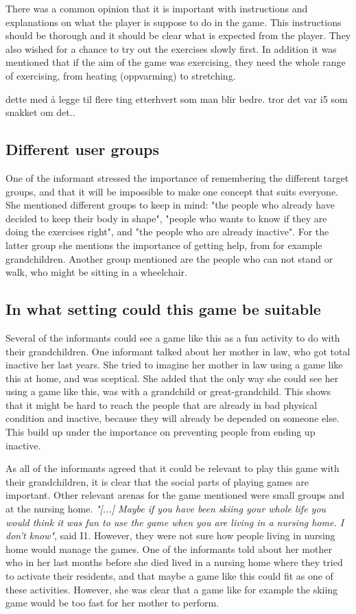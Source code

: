 There was a common opinion that it is important with instructions and explanations on what the player is suppose to do in the game. This instructions should be thorough and it should be clear what is expected from the player. They also wished for a chance to try out the exercises slowly first. In addition it was mentioned that if the aim of the game was exercising, they need the whole range of exercising, from heating (oppvarming) to stretching. 

dette med å legge til flere ting etterhvert som man blir bedre. tror det var i5 som snakket om det..

\subsection{Different user groups}
One of the informant stressed the importance of remembering the different target groups, and that it will be impossible to make one concept that suits everyone. She mentioned different groups to keep in mind: "the people who already have decided to keep their body in shape", "people who wants to know if they are doing the exercises right", and "the people who are already inactive". For the latter group she mentions the importance of getting help, from for example grandchildren.  Another group mentioned are the people who can not stand or walk, who might be sitting in a wheelchair.

\subsection{In what setting could this game be suitable}
Several of the informants could see a game like this as a fun activity to do with their grandchildren. One informant talked about her mother in law, who got total inactive her last years. She tried to imagine her mother in law using a game like this at home, and was sceptical. She added that the only way she could see her using a game like this, was with a grandchild or great-grandchild. This shows that it might be hard to reach the people that are already in bad physical condition and inactive, because they will already be depended on someone else. This build up under the importance on preventing people from ending up inactive.

As all of the informants agreed that it could be relevant to play this game with their grandchildren, it is clear that the social parts of playing games are important. Other relevant arenas for the game mentioned were small groups and at the nursing home. \emph{"[...] Maybe if you have been skiing your whole life you would think it was fun to use the game when you are living in a nursing home. I don't know"}, said I1. However, they were not sure how people living in nursing home would manage the games. One of the informants told about her mother who in her last months before she died lived in a nursing home where they tried to activate their residents, and that maybe a game like this could fit as one of these activities. However, she was clear that a  game like for example the skiing game would be too fast for her mother to perform. 

